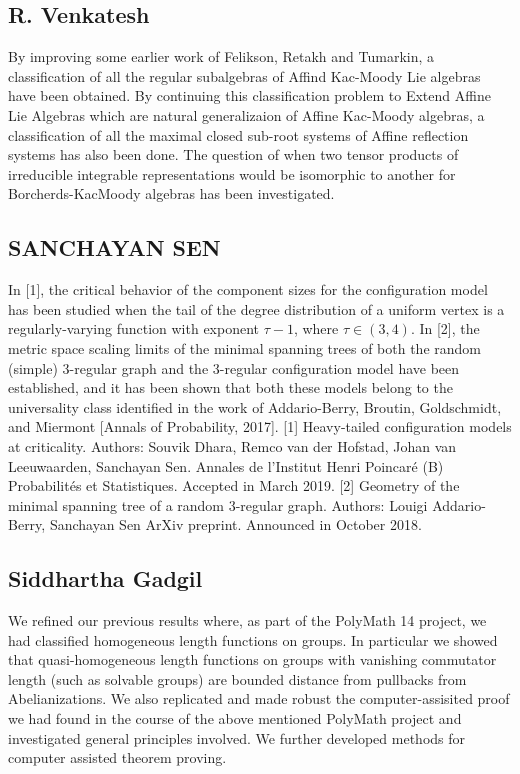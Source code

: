 \subsection{R. Venkatesh}

By improving some earlier work of Felikson, Retakh and Tumarkin, a classification of all the regular subalgebras of Affind Kac-Moody Lie algebras have been obtained. By continuing this classification problem to Extend Affine Lie Algebras which are natural generalizaion of Affine Kac-Moody algebras, a classification of all the maximal closed sub-root systems of Affine reflection systems has also been done. The question of when two tensor products of irreducible integrable representations would be isomorphic to another for Borcherds-KacMoody algebras has been investigated.


\subsection{SANCHAYAN SEN}

In [1], the critical behavior of the component sizes for the configuration model has been studied when the tail of the degree distribution of a uniform vertex is a regularly-varying function with exponent $\tau -1$, where $\tau\in (3, 4)$.   In [2], the metric space scaling limits of the minimal spanning trees of both the random (simple) 3-regular graph and the 3-regular configuration model have been established, and it has been shown that both these models belong to the universality class identified in the work of Addario-Berry, Broutin, Goldschmidt, and Miermont [Annals of Probability, 2017].   [1] Heavy-tailed configuration models at criticality.  Authors: Souvik Dhara, Remco van der Hofstad, Johan van Leeuwaarden, Sanchayan Sen.  Annales de l'Institut Henri Poincaré (B) Probabilités et Statistiques. Accepted in March 2019.  [2] Geometry of the minimal spanning tree of a random 3-regular graph.  Authors: Louigi Addario-Berry, Sanchayan Sen ArXiv preprint. Announced in October 2018.   


\subsection{Siddhartha Gadgil}

We refined our previous results where, as part of the PolyMath 14 project, we had classified homogeneous length functions on groups. In particular we showed that quasi-homogeneous length functions on groups with vanishing commutator length (such as solvable groups) are bounded distance from pullbacks from Abelianizations.  We also replicated and made robust the computer-assisited proof we had found in the course of the above mentioned PolyMath project and investigated general principles involved. We further developed methods for computer assisted theorem proving.


